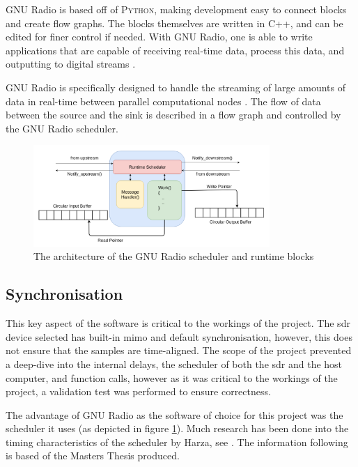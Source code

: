 \documentclass[class=report,11pt,crop=false]{standalone}
\begin{document}
GNU Radio is based off of \textsc{Python}, making development easy to connect blocks and create flow graphs. The blocks themselves are written in \textsc{C++}, and can be edited for finer control if needed. With GNU Radio, one is able to write applications that are capable of receiving real-time data, process this data, and outputting to digital streams \cite{gnuradio}. 

GNU Radio is specifically designed to handle the streaming of large amounts of data in real-time between parallel computational nodes \cite{gnu-delays}. The flow of data between the source and the sink is described in a flow graph and controlled by the GNU Radio scheduler.

\begin{figure}
    \centering
    \includegraphics[width=0.8\textwidth]{Images/diagrams/gnu-scheduler.png}
    \caption{The architecture of the GNU Radio scheduler and runtime blocks}
    \label{fig:gnu-scheduler}
\end{figure}

\subsection{Synchronisation}
This key aspect of the software is critical to the workings of the project. The \gls{sdr} device selected has built-in \gls{mimo} and default synchronisation, however, this does not ensure that the samples are time-aligned. The scope of the project prevented a deep-dive into the internal delays, the scheduler of both the \gls{sdr} and the host computer, and function calls, however as it was critical to the workings of the project, a validation test was performed to ensure correctness. 

The advantage of GNU Radio as the software of choice for this project was the scheduler it uses (as depicted in figure \ref{fig:gnu-scheduler}). Much research has been done into the timing characteristics of the scheduler by Harza, see \cite{gnu-delays}. The information following is based of the Masters Thesis produced.
\end{document}
